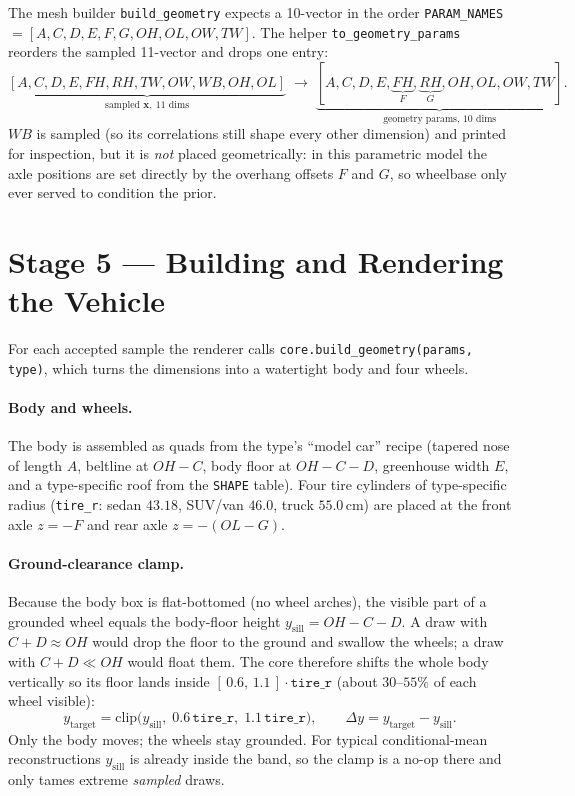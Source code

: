 \documentclass[11pt]{article}
\newcommand{\OL}{\mathit{OL}}
\newcommand{\OW}{\mathit{OW}}
\newcommand{\OH}{\mathit{OH}}
\newcommand{\WB}{\mathit{WB}}
\newcommand{\TW}{\mathit{TW}}
\newcommand{\FH}{\mathit{FH}}
\newcommand{\RH}{\mathit{RH}}
\newcommand{\bx}{\mathbf{x}}
\theoremstyle{definition}
\begin{document}
The mesh builder \texttt{build\_geometry} expects a 10-vector in the order \texttt{PARAM\_NAMES} $=[A,C,D,E,F,G,\OH,\OL,\OW,\TW]$. The helper \texttt{to\_geometry\_params} reorders the sampled 11-vector and drops one entry:
\begin{equation}
\underbrace{[A,C,D,E,\FH,\RH,\TW,\OW,\WB,\OH,\OL]}_{\text{sampled } \bx,\ \text{11 dims}}
\;\longrightarrow\;
\underbrace{[A,C,D,E,\underbrace{\FH}_{F},\underbrace{\RH}_{G},\OH,\OL,\OW,\TW]}_{\text{geometry params, 10 dims}}.
\end{equation}
$\WB$ is sampled (so its correlations still shape every other dimension) and printed for inspection, but it is \emph{not} placed geometrically: in this parametric model the axle positions are set directly by the overhang offsets $F$ and $G$, so wheelbase only ever served to condition the prior.

\section{Stage 5 --- Building and Rendering the Vehicle}

For each accepted sample the renderer calls \texttt{core.build\_geometry(params, type)}, which turns the dimensions into a watertight body and four wheels.

\paragraph{Body and wheels.} The body is assembled as quads from the type's ``model car'' recipe (tapered nose of length $A$, beltline at $\OH-C$, body floor at $\OH-C-D$, greenhouse width $E$, and a type-specific roof from the \texttt{SHAPE} table). Four tire cylinders of type-specific radius (\texttt{tire\_r}: sedan $43.18$, SUV/van $46.0$, truck $55.0$\,cm) are placed at the front axle $z=-F$ and rear axle $z=-(\OL-G)$.

\paragraph{Ground-clearance clamp.} Because the body box is flat-bottomed (no wheel arches), the visible part of a grounded wheel equals the body-floor height $y_{\text{sill}}=\OH-C-D$. A draw with $C{+}D\approx\OH$ would drop the floor to the ground and swallow the wheels; a draw with $C{+}D\ll\OH$ would float them. The core therefore shifts the whole body vertically so its floor lands inside $[\,0.6,\,1.1\,]\cdot\texttt{tire\_r}$ (about $30$--$55\%$ of each wheel visible):
\begin{equation}
y_{\text{target}}=\mathrm{clip}\big(y_{\text{sill}},\;0.6\,\texttt{tire\_r},\;1.1\,\texttt{tire\_r}\big),
\qquad \Delta y=y_{\text{target}}-y_{\text{sill}}.
\end{equation}
Only the body moves; the wheels stay grounded. For typical conditional-mean reconstructions $y_{\text{sill}}$ is already inside the band, so the clamp is a no-op there and only tames extreme \emph{sampled} draws.
\end{document}
